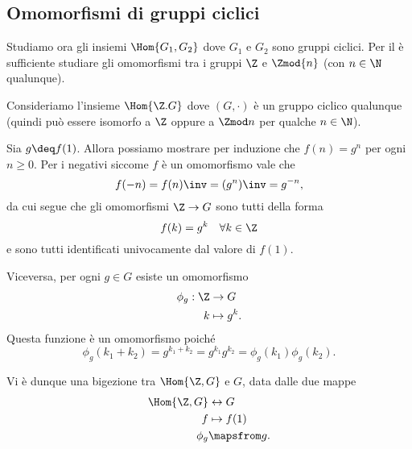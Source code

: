 \subsection{Omomorfismi di gruppi ciclici}

Studiamo ora gli insiemi $\Hom{G_1, G_2}$ dove $G_1$ e $G_2$ sono gruppi ciclici. Per il  è sufficiente studiare gli omomorfismi tra i gruppi $\Z$ e $\Zmod{n}$ (con $n \in \N$ qualunque).

 Consideriamo l'insieme $\Hom{\Z. G}$ dove $(G, \cdot)$ è un gruppo ciclico qualunque (quindi può essere isomorfo a $\Z$ oppure a $\Zmod n$ per qualche $n \in \N$). 

Sia $g \deq f(1)$. Allora possiamo mostrare per induzione che $f(n) = g^n$ per ogni $n \geq 0$. Per i negativi siccome $f$ è un omomorfismo vale che \[
    f(-n) = f(n)\inv = (g^n)\inv = g^{-n},    
\] da cui segue che gli omomorfismi $\Z \to G$ sono tutti della forma \[
    f(k) = g^k \quad \forall k \in \Z
\] e sono tutti identificati univocamente dal valore di $f(1)$.

Viceversa, per ogni $g \in G$ esiste un omomorfismo \begin{align*}
    \phi_g : \Z &\to G \\
    k &\mapsto g^k.
\end{align*} Questa funzione è un omomorfismo poiché \[
    \phi_g(k_1 + k_2) = g^{k_1 + k_2} = g^{k_1}g^{k_2} = \phi_g(k_1)\phi_g(k_2).
\]

Vi è dunque una bigezione tra $\Hom{\Z, G}$ e $G$, data dalle due mappe \begin{align*}
    \Hom{\Z, G} &\leftrightarrow G\\
    f &\mapsto f(1)\\
    \phi_g &\mapsfrom g.
\end{align*}